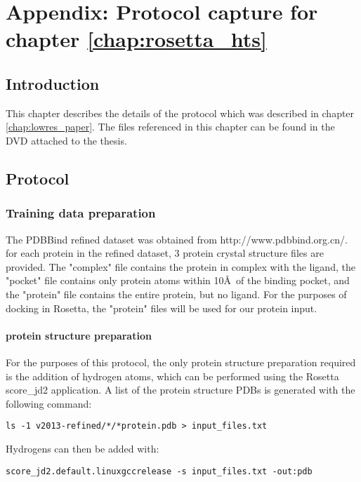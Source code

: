\chapter{Appendix:  Protocol capture for chapter \ref{chap:rosetta_hts}}
\label{chap:hts_appendix}
\section{Introduction}

This chapter describes the details of the protocol which was described in chapter \ref{chap:lowres_paper}.
The files referenced in this chapter can be found in the DVD attached to the thesis.

\section{Protocol}

\subsection{Training data preparation}
\label{subsec:training_data_prep}
The PDBBind refined dataset was obtained from http://www.pdbbind.org.cn/.
for each protein in the refined dataset, 3 protein crystal structure files are provided.
The "complex" file contains the protein in complex with the ligand, the "pocket" file contains only protein atoms within 10\AA\ of the binding pocket, and the "protein" file contains the entire protein, but no ligand.
For the purposes of docking in Rosetta, the "protein" files will be used for our protein input.

\subsubsection{protein structure preparation}

For the purposes of this protocol, the only protein structure preparation required is the addition of hydrogen atoms, which can be performed using the Rosetta score\_jd2 application.
A list of the protein structure \ac{PDB}s is generated with the following command:
\singlespace
\begin{Verbatim}
ls -1 v2013-refined/*/*protein.pdb > input_files.txt
\end{Verbatim}
\doublespace
Hydrogens can then be added with:
\singlespace
\begin{Verbatim}
score_jd2.default.linuxgccrelease -s input_files.txt -out:pdb
\end{Verbatim}
\doublespace

